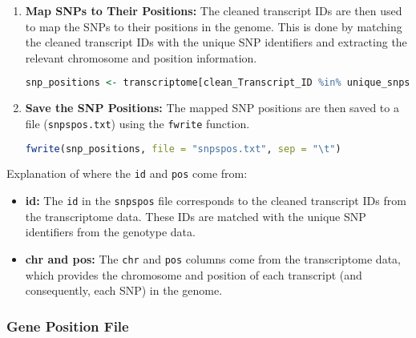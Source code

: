 \documentclass[12pt,a4paper]{article}
\begin{document}
\begin{enumerate}
    \item \textbf{Map SNPs to Their Positions:} The cleaned transcript IDs are then used to map the SNPs to their positions in the genome. This is done by matching the cleaned transcript IDs with the unique SNP identifiers and extracting the relevant chromosome and position information.
    \begin{lstlisting}[language=R]
    snp_positions <- transcriptome[clean_Transcript_ID %in% unique_snps, .(snp = clean_Transcript_ID, chr = CHROM, pos = POS)]
    \end{lstlisting}

    \item \textbf{Save the SNP Positions:} The mapped SNP positions are then saved to a file (\texttt{snpspos.txt}) using the \texttt{fwrite} function.
    \begin{lstlisting}[language=R]
    fwrite(snp_positions, file = "snpspos.txt", sep = "\t")
    \end{lstlisting}
\end{enumerate}

Explanation of where the \texttt{id} and \texttt{pos} come from:

\begin{itemize}
    \item \textbf{id:} The \texttt{id} in the \texttt{snpspos} file corresponds to the cleaned transcript IDs from the transcriptome data. These IDs are matched with the unique SNP identifiers from the genotype data.
    \item \textbf{chr and pos:} The \texttt{chr} and \texttt{pos} columns come from the transcriptome data, which provides the chromosome and position of each transcript (and consequently, each SNP) in the genome.
\end{itemize}

\subsubsection{Gene Position File}
\end{document}
